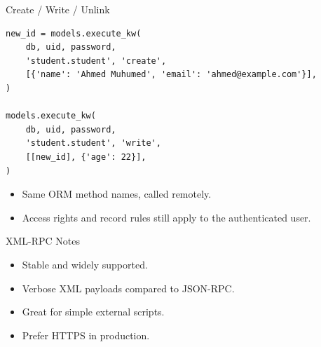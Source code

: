 \begin{frame}[fragile]{Create / Write / Unlink}
\begin{lstlisting}
new_id = models.execute_kw(
	db, uid, password,
	'student.student', 'create',
	[{'name': 'Ahmed Muhumed', 'email': 'ahmed@example.com'}],
)

models.execute_kw(
	db, uid, password,
	'student.student', 'write',
	[[new_id], {'age': 22}],
)
\end{lstlisting}
	\begin{itemize}
		\item Same ORM method names, called remotely.
		\item Access rights and record rules still apply to the authenticated user.
	\end{itemize}
\end{frame}

\begin{frame}{XML-RPC Notes}
	\begin{itemize}
		\item Stable and widely supported.
		\item Verbose XML payloads compared to JSON-RPC.
		\item Great for simple external scripts.
		\item Prefer HTTPS in production.
	\end{itemize}
\end{frame}
